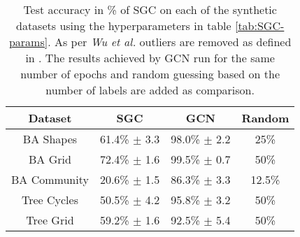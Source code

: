 \begin{table}
    \centering
    \begin{tabular}{c|c|cc}
        \textbf{Dataset} & \textbf{SGC} & \textbf{GCN} & \textbf{Random} \\
        \midrule
        BA Shapes       & 61.4\% $\pm$ 3.3 & 98.0\% $\pm$ 2.2 & 25\% \\
        BA Grid         & 72.4\% $\pm$ 1.6 & 99.5\% $\pm$ 0.7 & 50\% \\
        BA Community    & 20.6\% $\pm$ 1.5 & 86.3\% $\pm$ 3.3 & 12.5\% \\
        Tree Cycles     & 50.5\% $\pm$ 4.2 & 95.8\% $\pm$ 3.2 & 50\% \\
        Tree Grid       & 59.2\% $\pm$ 1.6 & 92.5\% $\pm$ 5.4 & 50\% \\
    \end{tabular}
    \caption{Test accuracy in \% of SGC on each of the synthetic datasets using the hyperparameters in table \ref{tab:SGC-params}. As per \textit{Wu et al.}\cite{wu2019simplifying} outliers are removed as defined in . The results achieved by GCN run for the same number of epochs and random guessing based on the number of labels are added as comparison.}
    \label{tab:SGC-acc}
\end{table}


